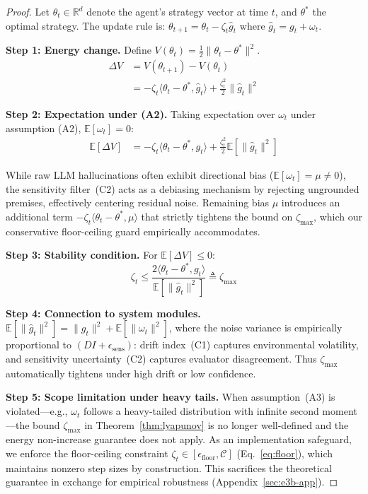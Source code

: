 \documentclass{article}
\begin{document}
\begin{proof}
Let $\theta_t \in \mathbb{R}^d$ denote the agent's strategy vector
at time $t$, and $\theta^*$ the optimal strategy. The update rule is:
$\theta_{t+1} = \theta_t - \zeta_t \hat{g}_t$
where $\hat{g}_t = g_t + \omega_t$.

\textbf{Step 1: Energy change.}
Define $V(\theta_t) = \tfrac{1}{2}\|\theta_t - \theta^*\|^2$.
\begin{align}
\Delta V &= V(\theta_{t+1}) - V(\theta_t) \nonumber \\
  &= -\zeta_t \langle \theta_t - \theta^*, \hat{g}_t \rangle
     + \tfrac{\zeta_t^2}{2}\|\hat{g}_t\|^2
\end{align}

\textbf{Step 2: Expectation under (A2).}
Taking expectation over $\omega_t$ under assumption (A2),
$\mathbb{E}[\omega_t] = 0$:
\begin{align}
\mathbb{E}[\Delta V] &= -\zeta_t \langle \theta_t - \theta^*, g_t
  \rangle + \tfrac{\zeta_t^2}{2}\mathbb{E}[\|\hat{g}_t\|^2]
\end{align}

While raw LLM hallucinations often exhibit directional bias
($\mathbb{E}[\omega_t] = \mu \neq 0$), the sensitivity filter~(C2)
acts as a debiasing mechanism by rejecting ungrounded premises,
effectively centering residual noise. Remaining bias $\mu$ introduces
an additional term $-\zeta_t \langle \theta_t - \theta^*, \mu \rangle$
that strictly tightens the bound on $\zeta_{\max}$, which our
conservative floor-ceiling guard empirically accommodates.

\textbf{Step 3: Stability condition.}
For $\mathbb{E}[\Delta V] \leq 0$:
\begin{equation}
  \zeta_t \leq \frac{2\langle \theta_t - \theta^*, g_t \rangle}
  {\mathbb{E}[\|\hat{g}_t\|^2]} \triangleq \zeta_{\max}
\end{equation}

\textbf{Step 4: Connection to system modules.}
$\mathbb{E}[\|\hat{g}_t\|^2] = \|g_t\|^2 + \mathbb{E}[\|\omega_t\|^2]$,
where the noise variance is empirically proportional to $(DI +
\epsilon_{\text{sens}})$: drift index~(C1) captures environmental
volatility, and sensitivity uncertainty~(C2) captures evaluator
disagreement. Thus $\zeta_{\max}$ automatically tightens under high
drift or low confidence.

\textbf{Step 5: Scope limitation under heavy tails.}
When assumption~(A3) is violated---e.g., $\omega_t$ follows a
heavy-tailed distribution with infinite second moment---the bound
$\zeta_{\max}$ in Theorem~\ref{thm:lyapunov} is no longer
well-defined and the energy non-increase guarantee does not apply.
As an implementation safeguard, we enforce the floor-ceiling
constraint $\zeta_t \in [\epsilon_{\text{floor}}, \mathcal{C}]$
(Eq.~\ref{eq:floor}), which maintains nonzero step sizes by
construction. This sacrifices the theoretical guarantee in exchange
for empirical robustness (Appendix~\ref{sec:e3b-app}).
\end{proof}
\end{document}
